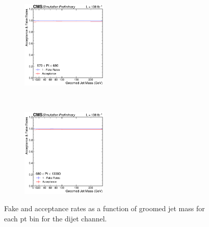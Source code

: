 \begin{figure}[htp!]
\begin{subfigure}
        \end{subfigure} 
        \begin{subfigure}
          \centering
          \includegraphics[width=0.45\textwidth]{figures/multijet/dijet/fakerates_groomed_3.pdf}
        \end{subfigure} \\
        \begin{subfigure}
          \centering
          \includegraphics[width=0.45\textwidth]{figures/multijet/dijet/fakerates_groomed_4.pdf}
        \end{subfigure}
	\caption{Fake and acceptance rates as a function of  groomed jet mass for each pt bin for the dijet channel.}
	\label{fig:fakeratesbinned_dijet_g}
      \end{figure}
      
